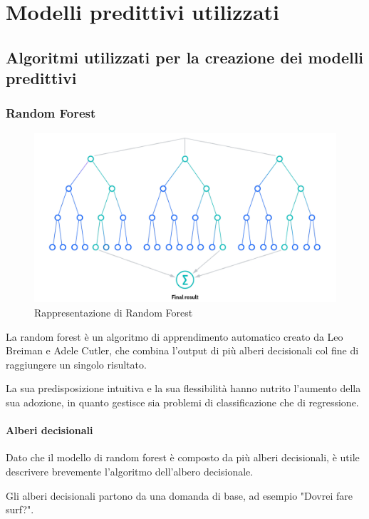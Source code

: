 \chapter{Modelli predittivi utilizzati}
\section{Algoritmi utilizzati per la creazione dei modelli predittivi}
\subsection{Random Forest}
\cite{radnomForestIbm}

\begin{figure}
    \begin{center}    
        \includegraphics[width=0.9\linewidth]{images/image10.png}
        \caption{Rappresentazione di Random Forest}
    \end{center}
\end{figure}

La random forest è un algoritmo di apprendimento automatico creato da Leo Breiman e Adele Cutler, che combina l'output di più alberi decisionali col fine di raggiungere un singolo risultato. 

La sua predisposizione intuitiva e la sua flessibilità hanno nutrito l’aumento della sua adozione, in quanto gestisce sia problemi di classificazione che di regressione.

\subsubsection{Alberi decisionali}
Dato che il modello di random forest è composto da più alberi decisionali, è utile descrivere brevemente l'algoritmo dell'albero decisionale. 

Gli alberi decisionali partono da una domanda di base, ad esempio "Dovrei fare surf?". 

